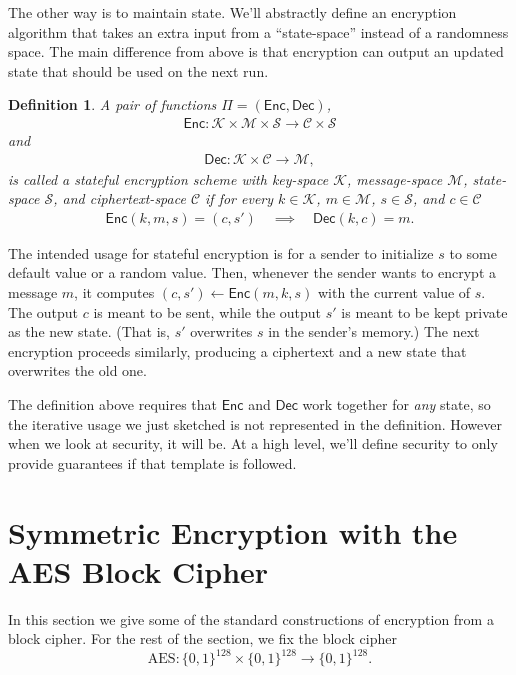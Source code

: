 \documentclass[11pt]{article}
\newtheorem{definition}{Definition}
\newcommand{\msgs}{\mathcal{M}}
\newcommand{\ctxts}{\mathcal{C}}
\newcommand{\keys}{\mathcal{K}}
\newcommand{\states}{\mathcal{S}}
\newcommand{\Enc}{\mathsf{Enc}}
\newcommand{\Dec}{\mathsf{Dec}}
\newcommand{\bits}{\{0,1\}}
\newcommand{\aes}{\mathrm{AES}}
\begin{document}
The other way is to maintain state. We'll abstractly define an encryption
algorithm that takes an extra input from a ``state-space'' instead of a
randomness space. The main difference from above is that encryption can output
an updated state that should be used on the next run.
\begin{definition}
    A pair of functions $\Pi=(\Enc,\Dec)$,
    \begin{align*}
        \Enc  : \keys\times\msgs\times\states  \to  \ctxts\times\states
    \end{align*}
    and
    \begin{align*}
        \Dec : \keys\times\ctxts \to \msgs,  
    \end{align*}
    is called a \emph{stateful encryption scheme with key-space $\keys$,
    message-space $\msgs$, state-space $\states$, and ciphertext-space
    $\ctxts$} if for every $k\in\keys$, $m\in\msgs$, $s\in\states$,
    and $c\in\ctxts$
    \begin{align*}
        \Enc(k,m,s)=(c,s') \quad \implies \quad \Dec(k,c)=m.
    \end{align*}
\end{definition}

The intended usage for stateful encryption is for a sender to initialize
$s$ to some default value or a random value. Then, whenever the sender
wants to encrypt a message $m$, it computes $(c,s') \gets \Enc(m,k,s)$ with the
current value of $s$. The output $c$ is meant to be sent, while the output
$s'$ is meant to be kept private as the new state. (That is, $s'$ overwrites
$s$ in the sender's memory.) The next encryption proceeds similarly, producing
a ciphertext and a new state that overwrites the old one.

The definition above requires that $\Enc$ and $\Dec$ work together for
\emph{any} state, so the iterative usage we just sketched is not represented in
the definition. However when we look at security, it will be. At a high level,
we'll define security to only provide guarantees if that template is followed.


\section{Symmetric Encryption with the AES Block Cipher}

In this section we give some of the standard constructions of encryption
from a block cipher. For the rest of the section, we fix the block cipher
\[
    \aes :\bits^{128} \times \bits^{128} \to \bits^{128}.
\]
\end{document}
